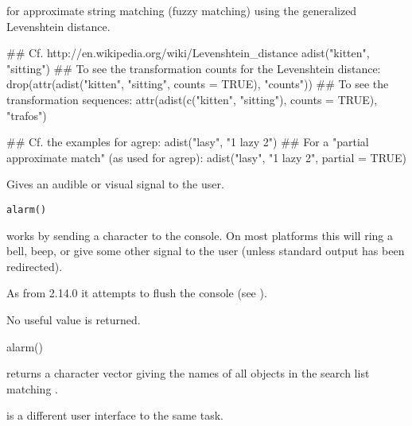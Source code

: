 %
\begin{SeeAlso}\relax
{} for approximate string matching (fuzzy matching)
using the generalized Levenshtein distance.
\end{SeeAlso}
%
\begin{Examples}
\begin{ExampleCode}
## Cf. http://en.wikipedia.org/wiki/Levenshtein_distance
adist("kitten", "sitting")
## To see the transformation counts for the Levenshtein distance:
drop(attr(adist("kitten", "sitting", counts = TRUE), "counts"))
## To see the transformation sequences:
attr(adist(c("kitten", "sitting"), counts = TRUE), "trafos")

## Cf. the examples for agrep:
adist("lasy", "1 lazy 2")
## For a "partial approximate match" (as used for agrep):
adist("lasy", "1 lazy 2", partial = TRUE)
\end{ExampleCode}
\end{Examples}
%
\begin{Description}\relax
Gives an audible or visual signal to the user.
\end{Description}
%
\begin{Usage}
\begin{verbatim}
alarm()
\end{verbatim}
\end{Usage}
%
\begin{Details}\relax
{} works by sending a  character to the console.
On most platforms this will ring a bell, beep, or give some other signal
to the user (unless standard output has been redirected).

As from \R{} 2.14.0 it attempts to flush the console (see
).
\end{Details}
%
\begin{Value}
No useful value is returned.
\end{Value}
%
\begin{Examples}
\begin{ExampleCode}
alarm()
\end{ExampleCode}
\end{Examples}
%
\begin{Description}\relax
{} returns a character vector giving the names of
all objects in the search list matching .

 is a different user interface to the same task.
\end{Description}

